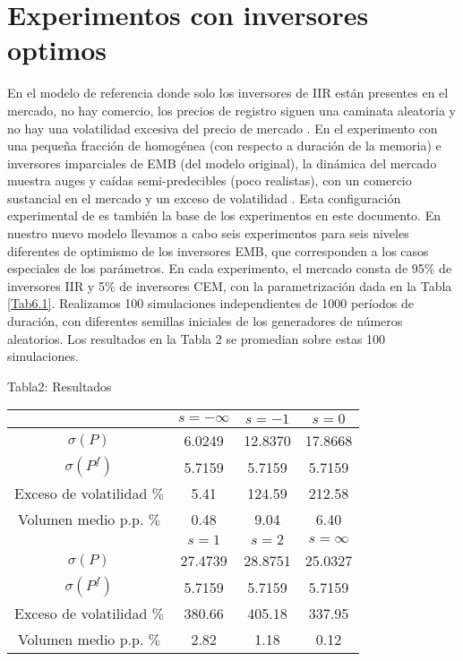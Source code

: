 \documentclass[12pt,a4paper]{article}
\begin{document}
\section*{Experimentos con inversores optimos}
En el modelo de referencia donde solo los inversores de IIR están presentes en el mercado, no hay comercio, los precios de registro siguen una caminata aleatoria y no hay una volatilidad excesiva del precio de mercado \citep{levy2000}. En el experimento con una pequeña fracción de homogénea (con respecto a duración de la memoria) e inversores imparciales de EMB (del modelo original), la dinámica del mercado muestra auges y caídas semi-predecibles (poco realistas), con un comercio sustancial en el mercado y un exceso de volatilidad \citep{levy2000}. Esta configuración experimental de \citep{levy2000} es también la base de los experimentos en este documento. En nuestro nuevo modelo llevamos a cabo seis experimentos para seis niveles diferentes de optimismo de los inversores EMB, que corresponden a los casos especiales de los parámetros. En cada experimento, el mercado consta de 95$\%$ de inversores IIR y 5$\%$ de inversores CEM, con la parametrización dada en la Tabla \ref{Tab6.1}. Realizamos 100 simulaciones independientes de 1000 períodos de duración, con diferentes semillas iniciales de los generadores de números aleatorios. Los resultados en la Tabla 2 se promedian sobre estas 100 simulaciones.
\begin{center}
Tabla2: Resultados
\begin{tabular}{|c|c|c|c|}
\hline
&$s=-\infty$&$s=-1$&$s=0$\\
\hline
$\sigma (P)$&6.0249&12.8370&17.8668\\
$\sigma (P^f)$&5.7159&5.7159&5.7159\\
Exceso de volatilidad $\%$&5.41&124.59&212.58\\
Volumen medio p.p. $\%$&0.48&9.04&6.40\\
\hline
&$s=1$&$s=2$&$s=\infty$\\
\hline 
$\sigma (P)$&27.4739&28.8751&25.0327\\
$\sigma (P^f)$&5.7159&5.7159&5.7159\\
Exceso de volatilidad $\%$&380.66&405.18&337.95\\
Volumen medio p.p. $\%$&2.82&1.18&0.12\\
\hline
\end{tabular}\label{Tab6.2}
\end{center}
\end{document}
